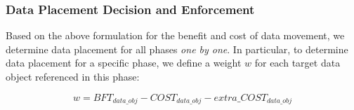 \begin{comment}
The above discussion on $COST_{data\_obj}$ assumes that there is enough empty memory space in DRAM to move the data object from NVM to DRAM. If there is no enough space, then some existing data objects in DRAM must be moved from DRAM to NVM. Such data movement cost should be included in $COST_{data\_obj}$. However, during the modeling time, whether 
there is enough space in DRAM is uncertain, because the data placement plan is not determined yet.
\end{comment}

\begin{comment}
For such case, $COST_{data\_obj}$ should include the data movement cost from DRAM to NVM. To calculate such cost, we must decide which data object in DRAM must be moved from DRAM to NVM. We make such decision based on the sizes of data objects in DRAM. In particular, we move data objects from DRAM to NVM whose total size is just big enough to allow the target data object to move from NVM to DRAM. Furthermore, the data movement from DRAM to NVM should be overlapped with application execution as much as possible. Using the same approach as the above discussion on the data movement from NVM to DRAM, we proactively trigger the data movement from DRAM to NVM and include
this cost in $COST_{data\_obj}$. 
\end{comment}

\begin{comment}
Based on the above formulation and discussion, we can calculate the benefit and cost of data movement from NVM to DRAM for any data object referenced in a specific phase.
\end{comment}


\subsubsection{Data Placement Decision and Enforcement}
\label{sec:dp_decision_enforcement}
Based on the above formulation for the benefit and cost of data movement, we determine data placement for all phases \textit{one by one}. In particular, to determine data placement for a specific phase, 
we define a weight $w$ for each target data object referenced in this phase:

\begin{equation}
w = BFT_{data\_obj} - COST_{data\_obj} - extra\_COST_{data\_obj}
\end{equation}

